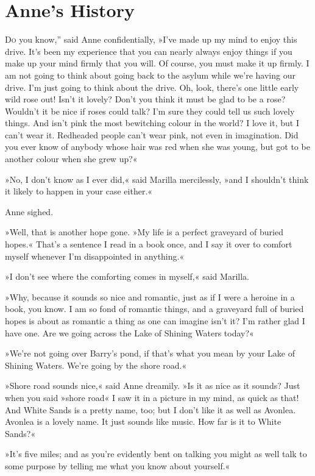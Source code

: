 \chapter{Anne’s History}

\lettrine[ante=“,lines=4]{D}{o} you know,” said Anne confidentially, »I’ve made up my mind to enjoy this drive. It’s been my experience that you can nearly always enjoy things if you make up your mind firmly that you will. Of course, you must make it up firmly. I am not going to think about going back to the asylum while we’re having our drive. I’m just going to think about the drive. Oh, look, there’s one little early wild rose out! Isn’t it lovely? Don’t you think it must be glad to be a rose? Wouldn’t it be nice if roses could talk? I’m sure they could tell us such lovely things. And isn’t pink the most bewitching colour in the world? I love it, but I can’t wear it. Redheaded people can’t wear pink, not even in imagination. Did you ever know of anybody whose hair was red when she was young, but got to be another colour when she grew up?«

»No, I don’t know as I ever did,« said Marilla mercilessly, »and I shouldn’t think it likely to happen in your case either.«

Anne sighed.

»Well, that is another hope gone. »My life is a perfect graveyard of buried hopes.« That’s a sentence I read in a book once, and I say it over to comfort myself whenever I’m disappointed in anything.«

»I don’t see where the comforting comes in myself,« said Marilla.

»Why, because it sounds so nice and romantic, just as if I were a heroine in a book, you know. I am so fond of romantic things, and a graveyard full of buried hopes is about as romantic a thing as one can imagine isn’t it? I’m rather glad I have one. Are we going across the Lake of Shining Waters today?«

»We’re not going over Barry’s pond, if that’s what you mean by your Lake of Shining Waters. We’re going by the shore road.«

»Shore road sounds nice,« said Anne dreamily. »Is it as nice as it sounds? Just when you said »shore road« I saw it in a picture in my mind, as quick as that! And White Sands is a pretty name, too; but I don’t like it as well as Avonlea. Avonlea is a lovely name. It just sounds like music. How far is it to White Sands?«

»It’s five miles; and as you’re evidently bent on talking you might as well talk to some purpose by telling me what you know about yourself.«

